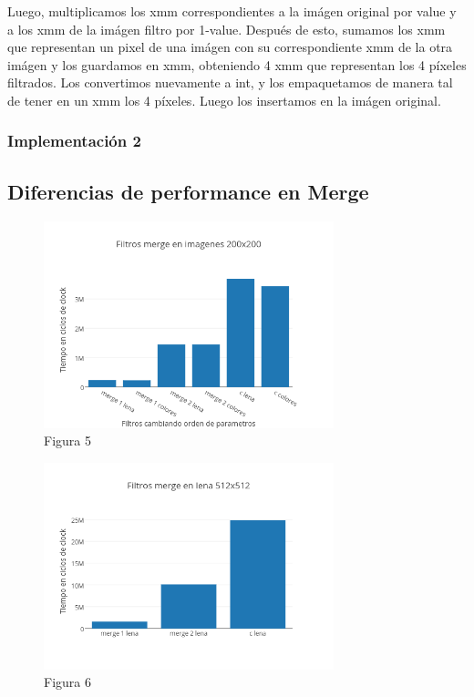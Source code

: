 \documentclass[a4paper]{article}
\begin{document}
\vspace*{0.3cm}

Luego, multiplicamos los xmm correspondientes a la imágen original por value y a los xmm de la imágen filtro por 1-value. Después de esto, sumamos los xmm que representan un pixel de una imágen con su correspondiente xmm de la otra imágen y los guardamos en xmm, obteniendo 4 xmm que representan los 4 píxeles filtrados. Los convertimos nuevamente a int, y los empaquetamos de manera tal de tener en un xmm los 4 píxeles. Luego los insertamos en la imágen original.

\vspace*{0.3cm}

\subsubsection{Implementación 2}



\subsection{Diferencias de performance en Merge}

\begin{figure}[h]
  \centering
    \includegraphics[width=0.75\textwidth]{imagenes/Filtros merge en imagenes 200x200.png}
  \caption{Figura 5}
  \label{fig:graficomerge1}
\end{figure}
 \FloatBarrier



\begin{figure}[h]
  \centering
    \includegraphics[width=0.75\textwidth]{imagenes/Filtros merge en lena 512x512.png}
  \caption{Figura 6}
  \label{fig:graficomerge2}
\end{figure}
 \FloatBarrier
\end{document}
